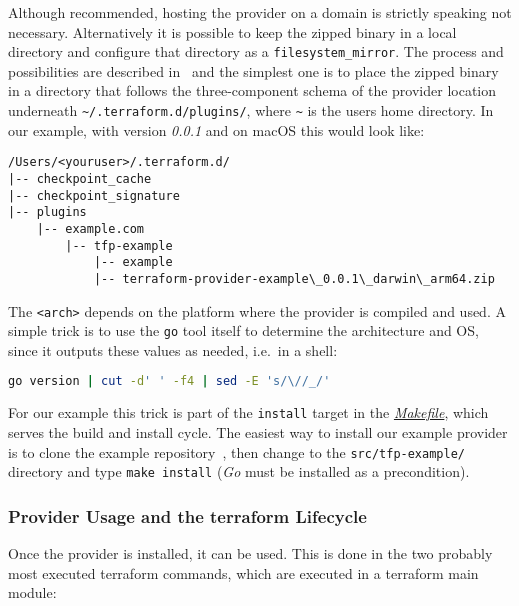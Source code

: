 \documentclass[paper=a4,11pt,numbers=noenddot]{article}
\begin{document}
Although recommended, hosting the provider on a domain is strictly speaking not necessary. Alternatively it is possible to keep the zipped binary in a local directory and configure that directory as a \verb'filesystem_mirror'. The process and possibilities are described in~\cite{noauthor_terraform_provider_installation_nodate} and the simplest one is to place the zipped binary in a directory that follows the three-component schema of the provider location underneath \verb'~/.terraform.d/plugins/', where \verb'~' is the users home directory. In our example, with version \emph{0.0.1} and on macOS this would look like:

\begin{lstlisting}
/Users/<youruser>/.terraform.d/
|-- checkpoint_cache
|-- checkpoint_signature
|-- plugins
    |-- example.com
        |-- tfp-example
            |-- example
            |-- terraform-provider-example\_0.0.1\_darwin\_arm64.zip
\end{lstlisting}

The \verb'<arch>' depends on the platform where the provider is compiled and used. A simple trick is to use the \verb'go' tool itself to determine the architecture and OS, since it outputs these values as needed, i.e.\ in a shell:

\begin{lstlisting}[language=bash,basicstyle=\ttfamily\footnotesize,numbers=none]
go version | cut -d' ' -f4 | sed -E 's/\//_/'
\end{lstlisting}

For our example this trick is part of the \verb'install' target in the \href{https://github.com/ecky-l/terraform-provider-example/blob/main/src/tfp-example/Makefile}{\emph{Makefile}}, which serves the build and install cycle. The easiest way to install our example provider is to clone the example repository~\cite{ecky-l_terraform-provider-example_nodate}, then change to the \verb'src/tfp-example/' directory and type \verb'make install' (\emph{Go} must be installed as a precondition).

\subsubsection{Provider Usage and the terraform Lifecycle}
\label{subsubsec:prov-usage-terr}

Once the provider is installed, it can be used. This is done in the two probably most executed terraform commands, which are executed in a terraform main module:
\end{document}
